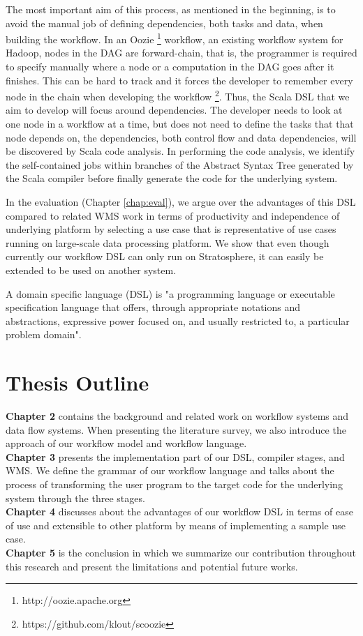 The most important aim of this process, as mentioned in the beginning, is to avoid the manual job of defining dependencies,  both tasks and data, when building the workflow. In an Oozie \footnote{\label{oozie}http://oozie.apache.org} workflow, an existing workflow system for Hadoop, nodes in the DAG are forward-chain, that is, the programmer is required to specify manually where a node or a computation in the DAG goes after it finishes. This can be hard to track and it forces the developer to remember every node in the chain when developing the workflow \footnote{\label{scoozie}https://github.com/klout/scoozie}. Thus, the Scala DSL that we aim to develop will focus around dependencies. The developer needs to look at one node in a workflow at a time, but does not need to define the tasks that that node depends on, the dependencies, both control flow and data dependencies, will be discovered by Scala code analysis. In performing the code analysis, we identify the self-contained jobs within branches of the Abstract Syntax Tree generated by the Scala compiler before finally generate the code for the underlying system. 

In the evaluation (Chapter \ref{chap:eval}), we argue over the advantages of this DSL compared to related WMS work in terms of productivity and independence of underlying platform by selecting a use case that is representative of use cases running on large-scale data processing platform. We show that even though currently our workflow DSL can only run on Stratosphere, it can easily be extended to be used on another system. 

\begin{definition}
A domain specific language (DSL) is "a programming language or executable specification language that offers, through appropriate notations and abstractions, expressive power focused on, and usually restricted to, a particular problem domain". \cite{van2000domain}
\label{def:dsl}
\end{definition}

\section{Thesis Outline}
\textbf{Chapter 2} contains the background and related work on workflow systems and data flow systems. When presenting the literature survey, we also introduce the approach of our workflow model and workflow language.\\
\textbf{Chapter 3} presents the implementation part of our DSL, compiler stages, and WMS. We define the grammar of our workflow language and talks about the process of transforming the user program to the target code for the underlying system through the three stages.\\
\textbf{Chapter 4} discusses about the advantages of our workflow DSL in terms of ease of use and extensible to other platform by means of implementing a sample use case.\\
\textbf{Chapter 5} is the conclusion in which we summarize our contribution throughout this research and present the limitations and potential future works. 